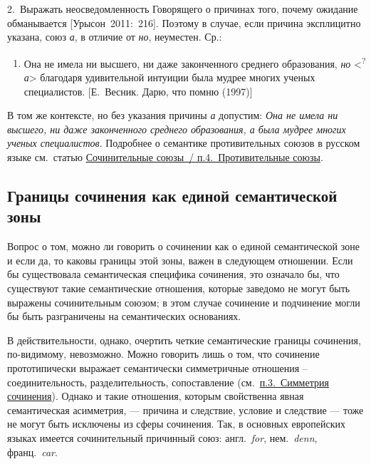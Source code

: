 2.~Выражать неосведомленность Говорящего о причинах того, почему
ожидание обманывается {[}Урысон~2011:~216{]}. Поэтому в случае, если
причина эксплицитно указана, союз \textit{а}, в отличие от \textit{но},
неуместен. Ср.:

\begin{enumerate}
  \def\labelenumi{(\arabic{enumi})}
  \setcounter{enumi}{175}
  \item
        Она не имела ни высшего, ни даже законченного среднего образования,
        \textit{но} \textless{}\textsuperscript{?}\textit{а}\textgreater{}
        благодаря удивительной интуиции была мудрее многих ученых
        специалистов. {[}Е.~Весник. Дарю, что помню (1997){]}
\end{enumerate}

В том же контексте, но без указания причины \textit{а} допустим: \textit{Она
  не имела ни высшего, ни даже законченного среднего образования, а была
  мудрее многих ученых специалистов}. Подробнее о семантике противительных
союзов в русском языке см.~статью \underline{Сочинительные союзы~/
  п.4.~Противительные союзы}.

\subsection{Границы сочинения как единой семантической
  зоны}\label{ux433ux440ux430ux43dux438ux446ux44b-ux441ux43eux447ux438ux43dux435ux43dux438ux44f-ux43aux430ux43a-ux435ux434ux438ux43dux43eux439-ux441ux435ux43cux430ux43dux442ux438ux447ux435ux441ux43aux43eux439-ux437ux43eux43dux44b}

Вопрос о том, можно ли говорить о сочинении как о единой семантической
зоне и если да, то каковы границы этой зоны, важен в следующем
отношении. Если бы существовала семантическая специфика сочинения, это
означало бы, что существуют такие семантические отношения, которые
заведомо не могут быть выражены сочинительным союзом; в этом случае
сочинение и подчинение могли бы быть разграничены на семантических
основаниях.

В действительности, однако, очертить четкие семантические границы
сочинения, по-видимому, невозможно. Можно говорить лишь о том, что
сочинение прототипически выражает семантически симметричные отношения --
соединительность, разделительность, сопоставление
(см.~\underline{п.3.~Симметрия сочинения}). Однако и такие отношения,
которым свойственна явная семантическая асимметрия, --- причина и
следствие, условие и следствие --- тоже не могут быть исключены из сферы
сочинения. Так, в основных европейских языках имеется сочинительный
причинный союз: англ.~\textit{for}, нем.~\textit{denn}, франц.~\textit{car}.


